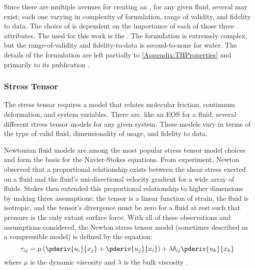 Since there are multiple avenues for creating an , for any given fluid, several may exist; each one varying in complexity of formulation, range of validity, and fidelity to data.
The choice of  is dependent on the importance of each of those three attributes.
The  used for this work is the .
The  formulation is extremely complex, but the range-of-validity and fidelity-to-data is second-to-none for water.
The details of the formulation are left partially to \cref{Appendix:THProperties} and primarily to its publication \cite{iapws_revised_2009}.



\subsubsection{Stress Tensor}
The stress tensor requires a model that relates molecular friction, continuum deformation, and system variables.
There are, like an EOS for a fluid, several different stress tensor models for any given system.
These models vary in terms of the type of valid fluid, dimensionality of usage, and fidelity to data.

Newtonian fluid models are among the most popular stress tensor model choices and form the basis for the Navier-Stokes equations.
From experiment, Newton observed that a proportional relationship exists between the shear stress exerted on a fluid and the fluid's uni-directional velocity gradient for a wide array of fluids.
Stokes then extended this proportional relationship to higher dimensions by making three assumptions: the tensor is a linear function of strain, the fluid is isotropic, and the tensor's divergence must be zero for a fluid at rest such that pressure is the only extant surface force.
With all of these observations and assumptions considered, the Newton stress tensor model (sometimes described as a compressible model) is defined by the equation:
\begin{equation}
    \tau_{ij} = \mu \left(\pderiv{u_i}{x_j} + \pderiv{u_j}{x_i}\right) + \lambda \delta_{ij} \pderiv{u_k}{x_k}
\end{equation}
where $\mu$ is the dynamic viscosity and $\lambda$ is the bulk viscosity \cite{johnson_handbook_1998-2}.


